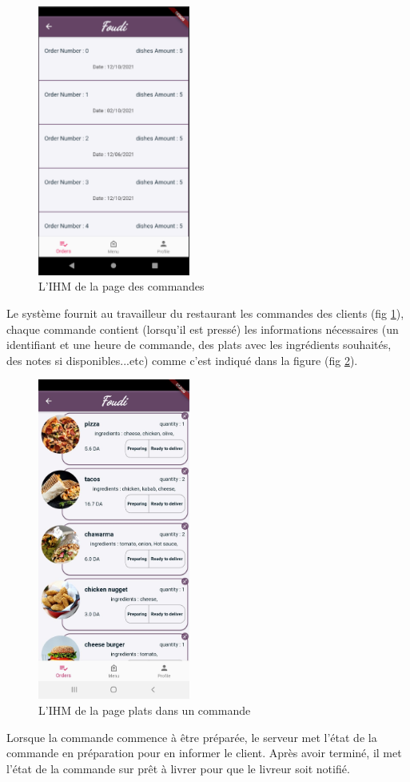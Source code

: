 \documentclass[french, a4paper, 12pt]{report}
\begin{document}
		\begin{figure}[h!]
			\center
			\includegraphics[width=5cm]{screenshots/Restaurantviews/ListofOrders(received).png}
			\caption{L'IHM de la page des commandes}
			\label{fig:restord}	
		\end{figure} Le système fournit au travailleur du restaurant les commandes des clients (fig \ref{fig:restord}), chaque commande contient (lorsqu'il est pressé) les informations nécessaires (un identifiant et une heure de commande, des plats avec les ingrédients souhaités, des notes si disponibles...etc) comme c'est indiqué dans  la figure (fig \ref{fig:restdish}).
		
		\newpage
		\begin{figure}[h!]
			\center
			\includegraphics[width=5cm]{screenshots/Restaurantviews/ListofDishes.jpg}
			\caption{L'IHM de la page plats dans un commande}
			\label{fig:restdish}	
		\end{figure}
		Lorsque la commande commence à être préparée, le serveur met l'état de la commande en préparation pour en informer le client. Après avoir terminé, il met l'état de la commande sur prêt à livrer pour que le livreur soit notifié.
		
\end{document}
